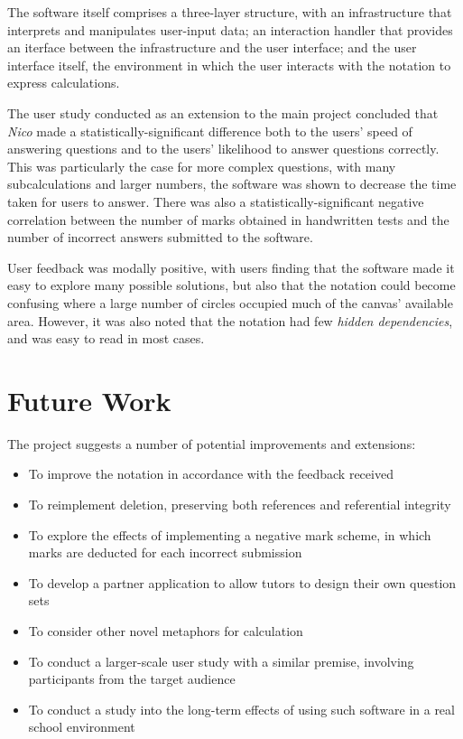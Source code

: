 \documentclass[12pt,twoside,notitlepage,xetex]{report}
\begin{document}
The software itself comprises a three-layer structure, with an infrastructure that interprets and manipulates user-input data; an interaction handler that provides an iterface between the infrastructure and the user interface; and the user interface itself, the environment in which the user interacts with the notation to express calculations.

The user study conducted as an extension to the main project concluded that \emph{Nico} made a statistically-significant difference both to the users' speed of answering questions and to the users' likelihood to answer questions correctly.  This was particularly the case for more complex questions, with many subcalculations and larger numbers, the software was shown to decrease the time taken for users to answer.  There was also a statistically-significant negative correlation between the number of marks obtained in handwritten tests and the number of incorrect answers submitted to the software.

User feedback was modally positive, with users finding that the software made it easy to explore many possible solutions, but also that the notation could become confusing where a large number of circles occupied much of the canvas' available area.  However, it was also noted that the notation had few \emph{hidden dependencies}, and was easy to read in most cases.

\section{Future Work}

The project suggests a number of potential improvements and extensions:
\begin{itemize}
\item To improve the notation in accordance with the feedback received
\item To reimplement deletion, preserving both references and referential integrity
\item To explore the effects of implementing a negative mark scheme, in which marks are deducted for each incorrect submission
\item To develop a partner application to allow tutors to design their own question sets
\item To consider other novel metaphors for calculation
\item To conduct a larger-scale user study with a similar premise, involving participants from the target audience
\item To conduct a study into the long-term effects of using such software in a real school environment
\end{itemize}
\end{document}
